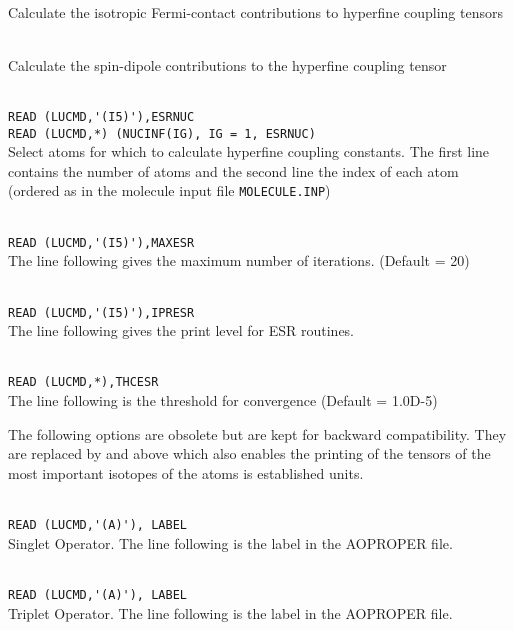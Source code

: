 \begin{description}
\item{} \\
Calculate the isotropic Fermi-contact contributions to hyperfine coupling tensors
\item{} \\
Calculate the spin-dipole contributions to the hyperfine coupling tensor
\item{} \\
\verb|READ (LUCMD,'(I5)'),ESRNUC |\\
\verb|READ (LUCMD,*) (NUCINF(IG), IG = 1, ESRNUC) | \\
Select atoms for which to calculate hyperfine coupling constants.
The first line contains  the number of atoms and the second line the
index of each atom (ordered as in the molecule input file \texttt{MOLECULE.INP})
\item{}      \\
\verb|READ (LUCMD,'(I5)'),MAXESR |\\
   The line following gives the maximum number of iterations.  (Default = 20)

\item{}     \\
\verb|READ (LUCMD,'(I5)'),IPRESR |\\
   The line following gives the print level for ESR routines.

\item{}     \\
\verb|READ (LUCMD,*),THCESR|\\
   The line following is the threshold for convergence (Default = 1.0D-5)

\end{description}
The following options are obsolete but are kept for backward compatibility.
They are replaced by  and  above which also
enables the printing of the tensors of the most important isotopes of the
atoms is established units.
\begin{description}

\item{}    \\
\verb|READ (LUCMD,'(A)'), LABEL|\\
   Singlet Operator. The line following is the label in the AOPROPER file.

\item{}    \\
\verb|READ (LUCMD,'(A)'), LABEL |\\
   Triplet Operator. The line following is the label in the AOPROPER file.


\end{description}


